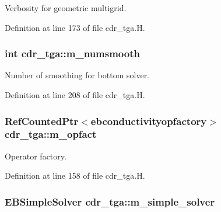 Verbosity for geometric multigrid. 



Definition at line 173 of file cdr\+\_\+tga.\+H.

\subsubsection[{\texorpdfstring{m\+\_\+numsmooth}{m_numsmooth}}]{\setlength{\rightskip}{0pt plus 5cm}int cdr\+\_\+tga\+::m\+\_\+numsmooth\hspace{0.3cm}{\ttfamily [protected]}}\hypertarget{classcdr__tga_af42be1f9af525ae00ef5603457c563a8}{}\label{classcdr__tga_af42be1f9af525ae00ef5603457c563a8}


Number of smoothing for bottom solver. 



Definition at line 208 of file cdr\+\_\+tga.\+H.

\subsubsection[{\texorpdfstring{m\+\_\+opfact}{m_opfact}}]{\setlength{\rightskip}{0pt plus 5cm}Ref\+Counted\+Ptr$<${\bf ebconductivityopfactory}$>$ cdr\+\_\+tga\+::m\+\_\+opfact\hspace{0.3cm}{\ttfamily [protected]}}\hypertarget{classcdr__tga_a56cc5421ad5cf91341b866cf002e5377}{}\label{classcdr__tga_a56cc5421ad5cf91341b866cf002e5377}


Operator factory. 



Definition at line 158 of file cdr\+\_\+tga.\+H.

\subsubsection[{\texorpdfstring{m\+\_\+simple\+\_\+solver}{m_simple_solver}}]{\setlength{\rightskip}{0pt plus 5cm}E\+B\+Simple\+Solver cdr\+\_\+tga\+::m\+\_\+simple\+\_\+solver\hspace{0.3cm}{\ttfamily [protected]}}\hypertarget{classcdr__tga_abab5acb873ba297c1c7d13c0542e4f1d}{}\label{classcdr__tga_abab5acb873ba297c1c7d13c0542e4f1d}


